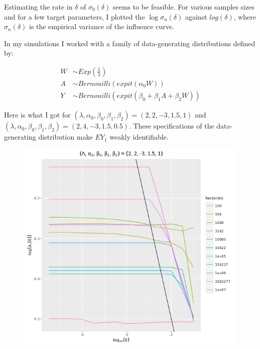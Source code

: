 \documentclass[a4paper]{article}
\begin{document}
Estimating the rate in $\delta$ of $\sigma_0(\delta)$ seems to be feasible. 
For various samples sizes and for a few target parameters, I plotted the $\log \sigma_n(\delta)$ against $log(\delta)$, where $\sigma_n(\delta)$ is the empirical variance of the influence curve.

In my simulations I worked with a family of data-generating distributions defined by:

\begin{align*}
W &\sim Exp\left(\frac{1}{\lambda} \right)\\
A &\sim Bernouilli(expit(\alpha_0 W)) \\
Y &\sim Bernouilli(expit(\beta_0 + \beta_1 A+ \beta_2 W))
\end{align*}

Here is what I got for $(\lambda, \alpha_0, \beta_0, \beta_1, \beta_2) = (2, 2, -3, 1.5, 1)$ and $(\lambda, \alpha_0, \beta_0, \beta_1, \beta_2) = (2, 4, -3, 1.5, 0.5)$. These specifications of the data-generating distribution make $EY_1$ weakly identifiable.

\begin{figure}[!htbp]
   \includegraphics[scale = 0.4]{sigm_n(delta)-hard-tp.png}
\end{figure}
\end{document}
